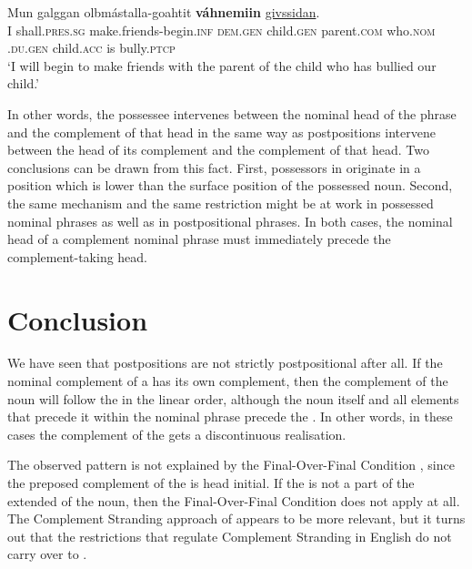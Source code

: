 \documentclass[output=paper]{LSP/langsci}
\begin{document}
    \gll    Mun  galggan        olbmástalla-goahtit               \textbf{váhnemiin}                          \uline{givssidan}.\\ 
	 I    shall.\textsc{pres.sg}    make.friends-begin.\textsc{inf}    \textsc{dem}.\textsc{gen}  child.\textsc{gen} parent.\textsc{com}    who.\textsc{nom}  \textsc{.du.gen}  child.\textsc{acc}  is    bully.\textsc{ptcp}\\
    \glt  ‘I will begin to make friends with the parent of the child who has bullied our child.’
    \z

In other words, the possessee intervenes between the nominal head of the  phrase and the complement of that head in the same way as postpositions intervene between the head of its complement and the complement of that head. Two conclusions can be drawn from this fact. First, possessors in  originate in a position which is lower than the surface position of the possessed noun. Second, the same mechanism and the same restriction might be at work in possessed nominal phrases as well as in postpositional phrases. In both cases, the nominal head of a complement nominal phrase must immediately precede the complement-taking head. 


\section{Conclusion} %

We have seen that  postpositions are not strictly postpositional after all. If the nominal complement of a  has its own complement, then the complement of the noun will follow the  in the linear order, although the noun itself and all elements that precede it within the nominal phrase precede the . In other words, in these cases the complement of the  gets a discontinuous realisation. 


The observed pattern is not explained by the Final-Over-Final Condition \citep{Holmberg2000deriving}, since the preposed complement of the  is head initial. If the  is not a part of the extended  of the noun, then the Final-Over-Final Condition does not apply at all. The Complement Stranding approach of \citet{Sheehan2009} appears to be more relevant, but it turns out that the restrictions that regulate Complement Stranding in English do not carry over to . 
\end{document}
